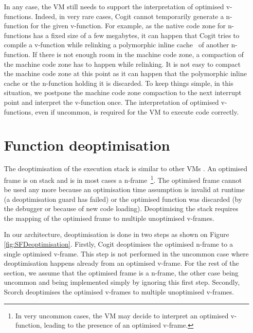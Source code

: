 \documentclass[a4paper,12pt,twoside]{../includes/ThesisStyle}
\begin{document}
In any case, the VM still needs to support the interpretation of optimised v-functions. Indeed, in very rare cases, Cogit cannot temporarily generate a n-function for the given v-function. For example, as the native code zone for n-functions has a fixed size of a few megabytes, it can happen that Cogit tries to compile a v-function while relinking a polymorphic inline cache~\cite{Holz91a} of another n-function. If there is not enough room in the machine code zone, a compaction of the machine code zone has to happen while relinking. It is not easy to compact the machine code zone at this point as it can happen that the polymorphic inline cache or the n-function holding it is discarded. To keep things simple, in this situation, we postpone the machine code zone compaction to the next interrupt point and interpret the v-function once. The interpretation of optimised v-functions, even if uncommon, is required for the VM to execute code correctly.  


\section {Function deoptimisation}
\label{sec:functionDeoptimisation}

The deoptimisation of the execution stack is similar to other VMs \cite{Fin03a, Holz92a}. An optimised frame is on stack and is in most cases a n-frame~\footnote{In very uncommon cases, the VM may decide to interpret an optimised v-function, leading to the presence of an optimised v-frame.}. The optimised frame cannot be used any more because an optimisation time assumption is invalid at runtime (a deoptimisation guard has failed) or the optimised function was discarded (by the debugger or because of new code loading). Deoptimising the stack requires the mapping of the optimised frame to multiple unoptimised v-frames. 

In our architecture, deoptimisation is done in two steps as shown on Figure \ref{fig:SFDeoptimisation}. Firstly, Cogit deoptimises the optimised n-frame to a single optimised v-frame. This step is not performed in the uncommon case where deoptimisation happens already from an optimised v-frame. For the rest of the section, we assume that the optimised frame is a n-frame, the other case being uncommon and being implemented simply by ignoring this first step. Secondly, Scorch deoptimises the optimised v-frames to multiple unoptimised v-frames.
\end{document}
